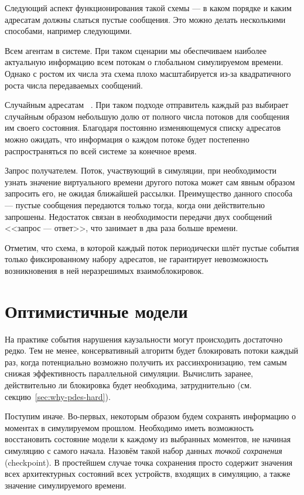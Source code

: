 Следующий аспект функционирования такой схемы --- в каком порядке  и каким адресатам должны слаться пустые сообщения. Это можно делать несколькими способами, например следующими.

\begin{description*}
\item[Всем агентам в системе.] При таком сценарии мы обеспечиваем наиболее актуальную информацию всем потокам о глобальном симулируемом времени. Однако с ростом их числа эта схема плохо масштабируется из-за квадратичного роста числа передаваемых сообщений.

\item[Случайным адресатам]~\cite{graphite2010}. При таком подходе отправитель каждый раз выбирает случайным образом небольшую долю от полного числа потоков для сообщения им своего состояния. Благодаря постоянно изменяющемуся списку адресатов можно ожидать, что информация о каждом потоке будет постепенно распространяться по всей системе за конечное время.

\item[Запрос получателем.] Поток, участвующий в симуляции, при необходимости узнать значение виртуального времени другого потока может сам явным образом запросить его, не ожидая ближайшей рассылки. Преимущество данного способа --- пустые сообщения передаются только тогда, когда они действительно запрошены. Недостаток связан в необходимости передачи двух сообщений <<запрос --- ответ>>, что занимает в два раза больше времени.
\end{description*}

Отметим, что схема, в которой каждый поток периодически шлёт пустые события только фиксированному набору адресатов, не гарантирует невозможность возникновения в ней неразрешимых взаимоблокировок.

\section{Оптимистичные модели}

На практике события нарушения каузальности могут происходить достаточно редко. Тем не менее, консервативный алгоритм будет блокировать потоки каждый раз, когда потенциально возможно получить их рассинхронизацию, тем самым снижая эффективность параллельной симуляции. Вычислить заранее, действительно ли блокировка будет необходима, затруднительно (см. секцию~\ref{sec:why-pdes-hard}).

Поступим иначе. Во-первых, некоторым образом будем сохранять информацию о моментах в симулируемом прошлом. Необходимо иметь возможность восстановить состояние модели к каждому из выбранных моментов, не начиная симуляцию с самого начала. Назовём такой набор данных \textit{точкой сохранения} (\abbr checkpoint). В простейшем случае точка сохранения просто содержит значения всех архитектурных состояний всех устройств, входящих в симуляцию, а также значение симулируемого времени.

